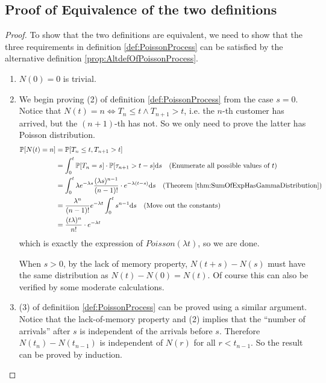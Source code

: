     \subsection{Proof of Equivalence of the two definitions}
        \begin{proof}
            To show that the two definitions are equivalent, we need to show that the three requirements in definition \ref{def:PoissonProcess} can be satisfied by the alternative definition \ref{prop:AltdefOfPoissonProcess}.
            \begin{enumerate}
                \item $N(0)=0$ is trivial.
                \item We begin proving (2) of definition \ref{def:PoissonProcess} from the case $s=0$. Notice that $N(t)=n \Leftrightarrow T_n \le t \wedge T_{n+1} > t$, i.e. the $n$-th customer has arrived, but the $(n+1)$-th has not. So we only need to prove the latter has Poisson distribution.
                \begin{align*}
                    \mathbb{P}[N(t)=n] &= \mathbb{P}[T_n \le t, T_{n+1} > t]\\
                    &= \int_0^t\mathbb{P}[T_n = s]\cdot\mathbb{P}[\tau_{n+1} > t-s]\mathrm{d}s \quad \text{(Enumerate all possible values of $t$)}\\
                    &= \int_0^t\lambda e^{-\lambda s}\frac{(\lambda s)^{n-1}}{(n-1)!}\cdot e^{-\lambda(t-s)}\mathrm{d}s \quad \text{(Theorem \ref{thm:SumOfExpHasGammaDistribution})}\\
                    &= \frac{\lambda^n}{(n-1)!}e^{-\lambda t}\int_0^t s^{n-1}\mathrm{d}s \quad \text{(Move out the constants)}\\
                    &= \frac{(t\lambda)^n}{n!}\cdot e^{-\lambda t}
                \end{align*}
                which is exactly the expression of $Poisson(\lambda t)$, so we are done.

                When $s > 0$, by the lack of memory property, $N(t+s)-N(s)$ must have the same distribution as $N(t) - N(0) = N(t)$. Of course this can also be verified by some moderate calculations.
                \item (3) of definitiion \ref{def:PoissonProcess} can be proved using a similar argument. Notice that the lack-of-memory property and (2) implies that the ``number of arrivals'' after $s$ is independent of the arrivals before $s$. Therefore $N(t_n) - N(t_{n-1})$ is independent of $N(r)$ for all $r < t_{n-1}$. So the result can be proved by induction.
            \end{enumerate}
        \end{proof}


